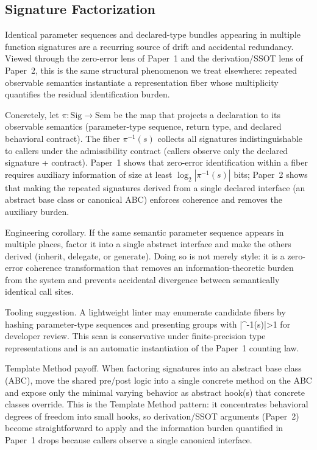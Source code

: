 \subsection{Signature Factorization}

Identical parameter sequences and declared-type bundles appearing in multiple function signatures are a recurring source of drift and accidental redundancy. Viewed through the zero-error lens of Paper~1 and the derivation/SSOT lens of Paper~2, this is the same structural phenomenon we treat elsewhere: repeated observable semantics instantiate a representation fiber whose multiplicity quantifies the residual identification burden.

Concretely, let \(\pi:\mathrm{Sig}\to\mathrm{Sem}\) be the map that projects a declaration to its observable semantics (parameter-type sequence, return type, and declared behavioral contract). The fiber \(\pi^{-1}(s)\) collects all signatures indistinguishable to callers under the admissibility contract (callers observe only the declared signature + contract). Paper~1 shows that zero-error identification within a fiber requires auxiliary information of size at least \(\log_2|\pi^{-1}(s)|\) bits; Paper~2 shows that making the repeated signatures derived from a single declared interface (an abstract base class or canonical ABC) enforces coherence and removes the auxiliary burden.

Engineering corollary. If the same semantic parameter sequence appears in multiple places, factor it into a single abstract interface and make the others derived (inherit, delegate, or generate). Doing so is not merely style: it is a zero-error coherence transformation that removes an information-theoretic burden from the system and prevents accidental divergence between semantically identical call sites.

Tooling suggestion. A lightweight linter may enumerate candidate fibers by hashing parameter-type sequences and presenting groups with |\pi^{-1}(s)|>1 for developer review. This scan is conservative under finite-precision type representations and is an automatic instantiation of the Paper~1 counting law.

Template Method payoff. When factoring signatures into an abstract base class (ABC), move the shared pre/post logic into a single concrete method on the ABC and expose only the minimal varying behavior as abstract hook(s) that concrete classes override. This is the Template Method pattern: it concentrates behavioral degrees of freedom into small hooks, so derivation/SSOT arguments (Paper~2) become straightforward to apply and the information burden quantified in Paper~1 drops because callers observe a single canonical interface.


